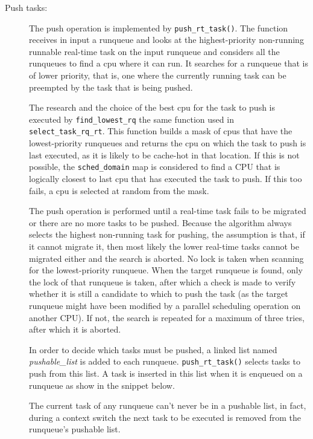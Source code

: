 \begin{description}
\item[Push tasks:] The push operation is implemented by \texttt{push\_rt\_task()}. The function receives in input a runqueue and looks at the 
highest-priority non-running runnable real-time task on the input runqueue and considers all the runqueues to find a cpu where it can run. It searches for 
a runqueue that is of lower priority, that is, one where the currently running task can be preempted by the task that is being pushed. 

The research and the choice of the best cpu for the task to push is executed by \texttt{find\_lowest\_rq} the same function used in 
\texttt{select\_task\_rq\_rt}. This function builds a mask of cpus that have the lowest-priority runqueues and returns the cpu on which the task to push is 
last executed, as it is likely to be cache-hot in that location. If this is not possible, the \texttt{sched\_domain} map is considered to find a CPU that 
is logically closest to last cpu that has executed the task to push. If this too fails, a cpu is selected at random from the mask.

The push operation is performed until a real-time task fails to be migrated or there are no more tasks to be pushed. Because the algorithm always selects 
the highest non-running task for pushing, the assumption is that, if it cannot migrate it, then most likely the lower real-time tasks cannot be migrated 
either and the search is aborted. No lock is taken when scanning for the lowest-priority runqueue. When the target runqueue is found, only the lock of that 
runqueue is taken, after which a check is made to verify whether it is still a candidate to which to push the task (as the target runqueue might have been 
modified by a parallel scheduling operation on another CPU). If not, the search is repeated for a maximum of three tries, after which it is aborted. 

In order to decide which tasks must be pushed, a linked list named \textit{pushable\_list} is added to each runqueue. \texttt{push\_rt\_task()} selects tasks
to push from this list. A task is inserted in this list when it is enqueued on a runqueue as show in the snippet below.

\lstset{basicstyle=\footnotesize, language=c, captionpos=b, frame=single, label=lis:steps}


The current task of any runqueue can't never be in a pushable list, in fact, during a context switch the next task to be executed is removed from the 
runqueue's pushable list.


\end{description}
